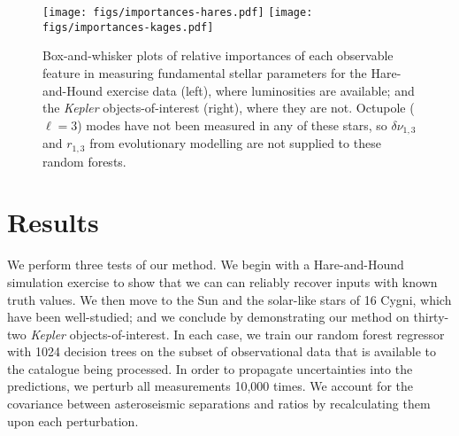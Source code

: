 \documentclass[manuscript]{aastex}
\begin{document}
\begin{figure*}
    \centering
    \texttt{[image: figs/importances-hares.pdf]}\hfill
    \texttt{[image: figs/importances-kages.pdf]}
    \caption{Box-and-whisker plots of relative importances of each observable feature in measuring fundamental stellar parameters for the Hare-and-Hound exercise data (left), where luminosities are available; and the \emph{Kepler} objects-of-interest (right), where they are not. Octupole ($\ell=3$) modes have not been measured in any of these stars, so $\delta\nu_{1,3}$ and $r_{1,3}$ from evolutionary modelling are not supplied to these random forests. }
    \label{fig:importances2}
\end{figure*}


\section{Results}
We perform three tests of our method. We begin with a Hare-and-Hound simulation exercise to show that we can can reliably recover inputs with known truth values. We then move to the Sun and the solar-like stars of 16 Cygni, which have been well-studied; and we conclude by demonstrating our method on thirty-two \emph{Kepler} objects-of-interest. In each case, we train our random forest regressor with 1024 decision trees on the subset of observational data that is available to the catalogue being processed. In order to propagate uncertainties into the predictions, we perturb all measurements 10,000 times. We account for the covariance between asteroseismic separations and ratios by recalculating them upon each perturbation. 


\end{document}
